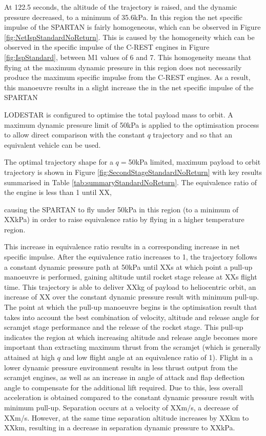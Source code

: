 At 122.5 seconds, the altitude of the trajectory is raised, and the dynamic pressure decreased, to a minimum of 35.6kPa. In this region the net specific impulse of the SPARTAN is fairly homogeneous, which can be observed in Figure \ref{fig:NetIspStandardNoReturn}. This is caused by the homogeneity which can be observed in the specific impulse of the C-REST engines in Figure \ref{fig:IspStandard}, between M1 values of 6 and 7. This homogeneity means that flying at the maximum dynamic pressure in this region does not necessarily produce the maximum specific impulse from the C-REST engines. As a result, this manoeuvre results in a slight increase the in the net specific impulse of the SPARTAN





LODESTAR is configured to optimise the total payload mass to orbit.
A maximum dynamic pressure limit of 50kPa is applied to the optimisation process to allow direct comparison with the constant $q$ trajectory and so that an equivalent vehicle can be used.   


The optimal trajectory shape for a $q=$50kPa limited, maximum payload to orbit trajectory is shown in Figure \ref{fig:SecondStageStandardNoReturn} with key results summarised in Table \ref{tab:summaryStandardNoReturn}. 
The equivalence ratio of the engine is less than 1 until XX,

 causing the SPARTAN to fly under 50kPa in this region (to a minimum of XXkPa) in order to raise equivalence ratio by flying in a higher temperature region. 

This increase in equivalence ratio results in a corresponding increase in net specific impulse.
After the equivalence ratio increases to 1, the trajectory follows a constant dynamic pressure path at 50kPa until XXs at which point a pull-up manoeuvre is performed, gaining altitude until rocket stage release at XXs flight time. 
This trajectory is able to deliver XXkg of payload to heliocentric orbit, an increase of XX over the constant dynamic pressure result with minimum pull-up. The point at which the pull-up manoeuvre begins is the optimisation result that takes into account the best combination of velocity, altitude and release angle for scramjet stage performance and the release of the rocket stage. This pull-up indicates the region at which increasing altitude and release angle becomes more important than extracting maximum thrust from the scramjet (which is generally attained at high $q$ and low flight angle at an equivalence ratio of 1).
Flight in a lower dynamic pressure environment results in less thrust output from the scramjet engines, as well as an increase in angle of attack and flap deflection angle to compensate for the additional lift required. Due to this, less overall acceleration is obtained compared to the constant dynamic pressure result with minimum pull-up. Separation occurs at a velocity of XXm/s, a decrease of XXm/s. However, at the same time separation altitude increases by XXkm to XXkm, resulting in a decrease in separation dynamic pressure to XXkPa. 

